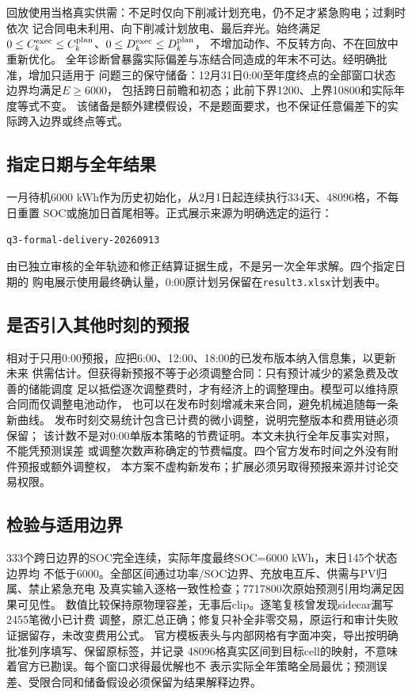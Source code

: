 回放使用当格真实供需：不足时仅向下削减计划充电，仍不足才紧急购电；过剩时依次
记合同电未利用、向下削减计划放电、最后弃光。始终满足
$0\le C_k^{\rm exec}\le C_k^{\rm plan}$、$0\le D_k^{\rm exec}\le D_k^{\rm plan}$，
不增加动作、不反转方向、不在回放中重新优化。
全年诊断曾暴露实际偏差与冻结合同造成的年末不可达。经明确批准，增加只适用于
问题三的保守储备：12月31日0:00至年度终点的全部窗口状态边界均满足$E\ge6000$，
包括跨日前瞻和初态；此前下界1200、上界10800和实际年度等式不变。
该储备是额外建模假设，不是题面要求，也不保证任意偏差下的实际跨入边界或终点等式。

\subsection{指定日期与全年结果}
一月待机6000 kWh作为历史初始化，从2月1日起连续执行334天、48096格，不每日重置
SOC或施加日首尾相等。正式展示来源为明确选定的运行：
\par\noindent\texttt{q3-formal-delivery-20260913}\par
由已独立审核的全年轨迹和修正结算证据生成，不是另一次全年求解。四个指定日期的
购电展示使用最终确认量，0:00原计划另保留在\texttt{result3.xlsx}计划表中。

\subsection{是否引入其他时刻的预报}
相对于只用0:00预报，应把6:00、12:00、18:00的已发布版本纳入信息集，以更新未来
供需估计。但获得新预报不等于必须调整合同：只有预计减少的紧急费及改善的储能调度
足以抵偿逐次调整费时，才有经济上的调整理由。模型可以维持原合同而仅调整电池动作，
也可以在发布时刻增减未来合同，避免机械追随每一条新曲线。
发布时刻交易统计包含已计费的微小调整，说明完整版本和费用链必须保留；
该计数不是对0:00单版本策略的节费证明。本文未执行全年反事实对照，不能凭预测误差
或调整次数声称确定的节费幅度。四个官方发布时间之外没有附件预报或额外调整权，
本方案不虚构新发布；扩展必须另取得预报来源并讨论交易权限。

\subsection{检验与适用边界}
333个跨日边界的SOC完全连续，实际年度最终SOC=6000 kWh，末日145个状态边界均
不低于6000。全部区间通过功率/SOC边界、充放电互斥、供需与PV归属、禁止紧急充电
及真实输入逐格一致性检查；7717800次原始预测引用均满足因果可见性。
数值比较保持原物理容差，无事后clip。逐笔复核曾发现sidecar漏写2455笔微小已计费
调整，原汇总正确；修复只补全非零交易，原运行和审计失败证据留存，未改变费用公式。
官方模板表头与内部网格有字面冲突，导出按明确批准列序填写、保留原标签，并记录
48096格真实区间到目标cell的映射，不意味着官方已勘误。每个窗口求得最优解也不
表示实际全年策略全局最优；预测误差、受限合同和储备假设必须保留为结果解释边界。
